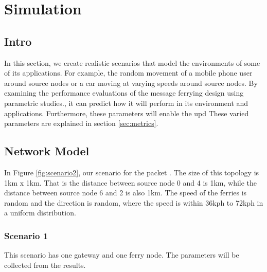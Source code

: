 \chapter{Simulation}

\section{Intro}

In this section, we create realistic scenarios that model the environments of some of its applications.  
For example, the random movement of a mobile phone user around source nodes or a car moving at varying speeds around source nodes.  
By examining the performance evaluations of the message ferrying design using parametric studies., it can predict how it will perform in its environment and applications.
Furthermore, these parameters will enable the upd
These varied parameters are explained in section \ref{sec:metrics}.


\section{Network Model}

In Figure \ref{fig:scenario2}, our scenario for the packet .  
The size of this topology is 1km x 1km.  
That is the distance between source node 0 and 4 is 1km, while the distance between source node 6 and 2 is also 1km.  
The speed of the ferries is random and the direction is random, where the speed is within 36kph to 72kph in a uniform distribution.  




\subsection{Scenario 1}

This scenario has one gateway and one ferry node.
The parameters will be collected from the results.

